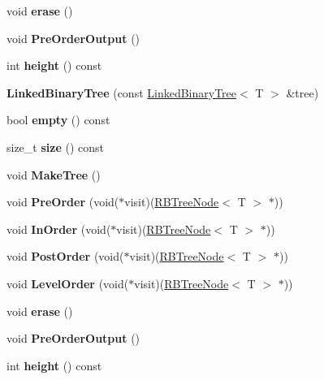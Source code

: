 \begin{DoxyCompactItemize}
void {\bfseries erase} ()
\item 
\mbox{\label{classLinkedBinaryTree_a186b387b4f08ca1abfbcd26b37e56fc3}} 
void {\bfseries Pre\+Order\+Output} ()
\item 
\mbox{\label{classLinkedBinaryTree_ae9d3b8ff0ca1850789023991794b00cf}} 
int {\bfseries height} () const
\item 
\mbox{\label{classLinkedBinaryTree_af79026e3ff32394af7fa4bc17104b2f2}} 
{\bfseries Linked\+Binary\+Tree} (const \hyperlink{classLinkedBinaryTree}{Linked\+Binary\+Tree}$<$ T $>$ \&tree)
\item 
\mbox{\label{classLinkedBinaryTree_a31090e85a7b2a6b8cad23717ec433ceb}} 
bool {\bfseries empty} () const
\item 
\mbox{\label{classLinkedBinaryTree_a7ec639d841538074a028211d9a4362e8}} 
size\+\_\+t {\bfseries size} () const
\item 
\mbox{\label{classLinkedBinaryTree_a61115f0284fc3ab3ff46fe24a2ba83e9}} 
void {\bfseries Make\+Tree} ()
\item 
\mbox{\label{classLinkedBinaryTree_a56d6d694f598016863b7187df9a4f832}} 
void {\bfseries Pre\+Order} (void($\ast$visit)(\hyperlink{structRBTreeNode}{R\+B\+Tree\+Node}$<$ T $>$ $\ast$))
\item 
\mbox{\label{classLinkedBinaryTree_ab252e8fb5975132a29b85072c79d3786}} 
void {\bfseries In\+Order} (void($\ast$visit)(\hyperlink{structRBTreeNode}{R\+B\+Tree\+Node}$<$ T $>$ $\ast$))
\item 
\mbox{\label{classLinkedBinaryTree_a0f89168cebd717b188f8ee25e04bc4e4}} 
void {\bfseries Post\+Order} (void($\ast$visit)(\hyperlink{structRBTreeNode}{R\+B\+Tree\+Node}$<$ T $>$ $\ast$))
\item 
\mbox{\label{classLinkedBinaryTree_adf9ff858db2e4a7a44ffdde9009d86dc}} 
void {\bfseries Level\+Order} (void($\ast$visit)(\hyperlink{structRBTreeNode}{R\+B\+Tree\+Node}$<$ T $>$ $\ast$))
\item 
\mbox{\label{classLinkedBinaryTree_a43286c1f8b340ff84e73a0f103ebbfe2}} 
void {\bfseries erase} ()
\item 
\mbox{\label{classLinkedBinaryTree_a186b387b4f08ca1abfbcd26b37e56fc3}} 
void {\bfseries Pre\+Order\+Output} ()
\item 
\mbox{\label{classLinkedBinaryTree_ae9d3b8ff0ca1850789023991794b00cf}} 
int {\bfseries height} () const
\end{DoxyCompactItemize}
